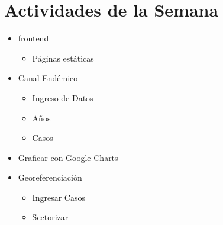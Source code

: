\section{Actividades de la Semana}

\begin{itemize}
	\item frontend
		\begin{itemize}
			\item Páginas estáticas
		\end{itemize}
	\item Canal Endémico
	\begin{itemize}
		\item Ingreso de Datos
		\item Años
		\item Casos
	\end{itemize}
	\item Graficar con Google Charts
	\item Georeferenciación
		\begin{itemize}
			\item Ingresar Casos
			\item Sectorizar
		\end{itemize}

\end{itemize}
